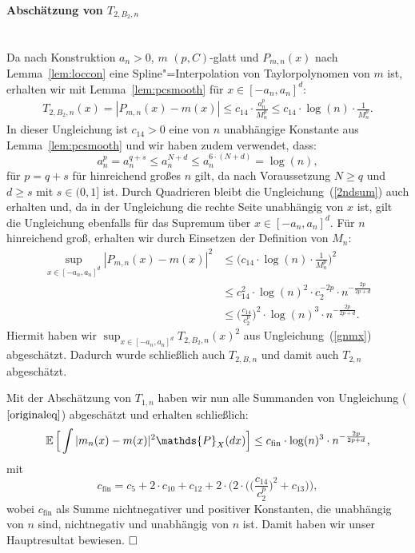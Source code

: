 \paragraph*{Abschätzung von $T_{2,B_2,n}$}\mbox{}\\
Da nach Konstruktion $a_n > 0$, $m$ $(p, C)$-glatt und $P_{m,n}(x)$ nach Lemma~\ref{lem:loccon} eine Spline"=Interpolation von Taylorpolynomen von $m$ ist, erhalten wir mit Lemma~\ref{lem:pcsmooth} für $x \in [-a_n,a_n]^d$:
\begin{equation}
\label{2ndsum}
\begin{split}
T_{2,B_2,n}(x) = |P_{m,n}(x) - m(x)| \leq c_{14} \cdot \frac{a_n^p}{M_n^p} \leq c_{14} \cdot \log(n) \cdot \frac{1}{M_n^p}.
\end{split}
\end{equation}
In dieser Ungleichung ist $c_{14} > 0$ eine von $n$ unabhängige Konstante aus Lemma~\ref{lem:pcsmooth} und wir haben zudem verwendet, dass:
$$a_n^p = a_n^{q + s} \leq a_n^{N + d} \leq a_n^{6 \cdot (N + d)} = \log(n),$$
für $p = q + s$ für hinreichend großes $n$ gilt, da nach Voraussetzung $N \geq q$ und $d \geq s$ mit $s \in (0, 1]$ ist.
Durch Quadrieren bleibt die Ungleichung~(\ref{2ndsum}) auch erhalten und, da in der Ungleichung die rechte Seite unabhängig von $x$ ist, gilt die Ungleichung ebenfalls für das Supremum über $x \in [-a_n,a_n]^d$. Für $n$ hinreichend groß, erhalten wir durch Einsetzen der Definition von $M_n$:
\begin{equation}
\label{4thsum}
\begin{split}
\sup_{x \in [-a_n, a_n]^d} |P_{m,n}(x) - m(x)|^2 & \leq \bigg(c_{14} \cdot \log(n) \cdot \frac{1}{M_n^p}\bigg)^2 \\
& \leq c_{14}^2 \cdot \log(n)^2 \cdot c_{2}^{-2p} \cdot n^{-\frac{2p}{2p + d}} \\[0.5em]
& \leq \Big(\frac{c_{14}}{c_2^p}\Big)^2 \cdot \log(n)^3 \cdot n^{-\frac{2p}{2p + d}}.
\end{split}
\end{equation}
Hiermit haben wir $\sup_{x \in [-a_n, a_n]^d} T_{2,B_2,n}(x)^2$ aus Ungleichung~(\ref{gnmx}) abgeschätzt.
Dadurch wurde schließlich auch $T_{2,B,n}$ und damit auch $T_{2,n}$ abgeschätzt.  

Mit der Abschätzung von $T_{1,n}$ haben wir nun alle Summanden von Ungleichung ($\ref{originaleq}$) abgeschätzt und erhalten schließlich:
\begin{equation*}
\E \Big[\int |m_n(x) - m(x)|^2 \mathds{P}_X(dx)\Big] \leq c_{\mathrm{fin}} \cdot \log(n)^3 \cdot n^{- \frac{2p}{2p + d}},
\end{equation*}
mit 
$$c_{\mathrm{fin}} = c_{5} + 2 \cdot c_{10} + c_{12} + 2 \cdot \Bigg(2 \cdot \bigg( \Big(\frac{c_{14}}{c_2^p}\Big)^2 +  c_{13}\bigg)\Bigg),$$
wobei $c_{\mathrm{fin}}$ als Summe nichtnegativer und positiver Konstanten, die unabhängig von $n$ sind, nichtnegativ und unabhängig von $n$ ist.
Damit haben wir unser Hauptresultat bewiesen. $\hfill\square$ 	